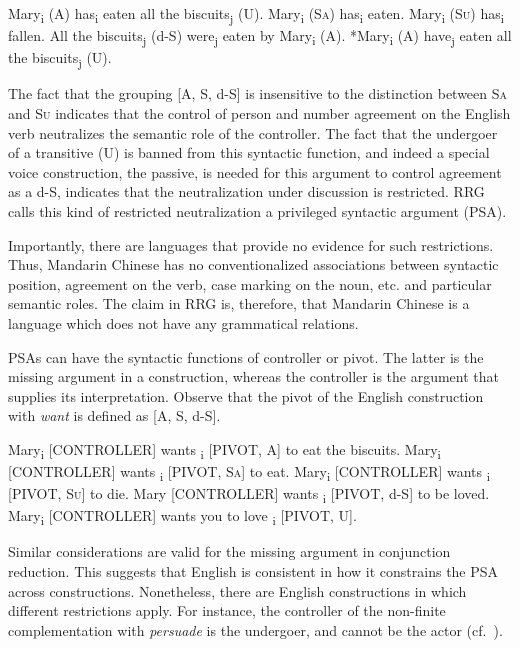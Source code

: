 \documentclass[output=paper,hidelinks]{langscibook}
\begin{document}
\ea%
   \label{ex:RRG:15}
\ea\label{ex:RRG:15a} Mary\textsubscript{i} (A) has\textsubscript{i} eaten all the biscuits\textsubscript{j} (U).
\ex\label{ex:RRG:15b} Mary\textsubscript{i} (S\textsc{a}) has\textsubscript{i} eaten.
\ex\label{ex:RRG:15c} Mary\textsubscript{i} (S\textsc{u}) has\textsubscript{i} fallen.
\ex\label{ex:RRG:15d} All the biscuits\textsubscript{j} (d-S) were\textsubscript{j} eaten by Mary\textsubscript{i} (A).
\ex\label{ex:RRG:15e} *Mary\textsubscript{i} (A) have\textsubscript{j} eaten all the biscuits\textsubscript{j} (U).
   \z\z

\largerpage[2]
  The fact that the grouping [A, S, d-S] is insensitive to the distinction between S\textsc{a} and S\textsc{u} indicates that the control of person and number agreement on the English verb neutralizes the semantic role of the controller. The fact that the undergoer of a transitive (U) is banned from this syntactic function, and indeed a special voice construction, the passive, is needed for this argument to control agreement as a d-S, indicates that the neutralization under discussion is restricted. RRG calls this kind of restricted neutralization a privileged syntactic argument (PSA).\clearpage

  Importantly, there are languages that provide no evidence for such restrictions. Thus, Mandarin Chinese \citep{LaPolla1990,LaPolla1993,LaPolla1995,LaPolla2022} has no conventionalized associations between syntactic position, agreement on the verb, case marking on the noun, etc. and particular semantic roles. The claim in RRG is, therefore, that Mandarin Chinese is a language which does not have any grammatical relations.

  PSAs can have the syntactic functions of controller or pivot. The latter is the missing argument in a construction, whereas the controller is the argument that supplies its interpretation. Observe that the pivot of the English construction with \textit{want} is defined as [A, S, d-S].

\ea%
\label{ex:RRG:16}
\ea  Mary\textsubscript{i} [CONTROLLER] wants \GAP\textsubscript{i} [PIVOT, A] to eat the biscuits.
\ex  Mary\textsubscript{i} [CONTROLLER] wants \GAP\textsubscript{i} [PIVOT, S\textsc{a}] to eat.
\ex  Mary\textsubscript{i} [CONTROLLER] wants \GAP\textsubscript{i}  [PIVOT, S\textsc{u}] to die.
\ex  Mary [CONTROLLER] wants \GAP\textsubscript{i} [PIVOT, d-S] to be loved.
\ex *Mary\textsubscript{i} [CONTROLLER] wants you to love \GAP\textsubscript{i} [PIVOT, U].
    \z\z


  Similar considerations are valid for the missing argument in conjunction reduction. This suggests that English is consistent in how it constrains the PSA across constructions. Nonetheless, there are English constructions in which different restrictions apply. For instance, the controller of the non-finite complementation with \textit{persuade} is the undergoer, and cannot be the actor (cf.\ ).
\end{document}
